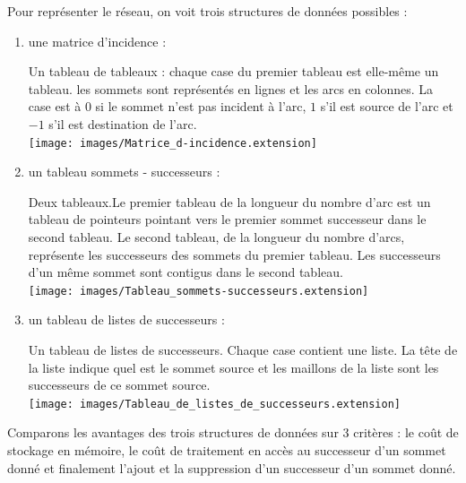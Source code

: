 \documentclass[11pt, a4paper]{report}
\begin{document}
	Pour représenter le réseau, on voit trois structures de données possibles :
	\begin{enumerate}
		\item une matrice d'incidence :
		
		Un tableau de tableaux : chaque case du premier tableau est elle-même un tableau. les sommets sont représentés en lignes et les arcs en colonnes. La case est à $0$ si le sommet n'est pas incident à l'arc, $1$ s'il est source de l'arc et $-1$ s'il est destination de l'arc.\\
		\texttt{[image: images/Matrice\_d-incidence.extension]}\\
		
		\item un tableau sommets - successeurs :
		
		Deux tableaux.Le premier tableau de la longueur du nombre d'arc est un tableau de pointeurs pointant vers le premier sommet successeur dans le second tableau. Le second tableau, de la longueur du nombre d'arcs, représente les successeurs des sommets du premier tableau. Les successeurs d'un même sommet sont contigus dans le second tableau.\\
		\texttt{[image: images/Tableau\_sommets-successeurs.extension]}\\
		
		\item un tableau de listes de successeurs :
		
		Un tableau de listes de successeurs. Chaque case contient une liste. La tête de la liste indique quel est le sommet source et les maillons de la liste sont les successeurs de ce sommet source.\\
		\texttt{[image: images/Tableau\_de\_listes\_de\_successeurs.extension]}\\
		
	\end{enumerate}
	
    Comparons les avantages des trois structures de données sur 3 critères : le coût de stockage en mémoire, le coût de traitement en accès au successeur d'un sommet donné et finalement l'ajout et la suppression d'un successeur d'un sommet donné.
    
\end{document}
